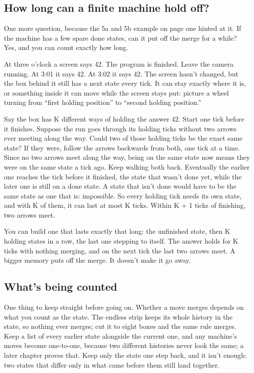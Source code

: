 \documentclass[11pt,twoside]{article}
\theoremstyle{thielethm}
\theoremstyle{thieledef}
\theoremstyle{thieledef}
\theoremstyle{thieledef}
\theoremstyle{thielethm}
\theoremstyle{thieleobs}
\theoremstyle{thielethm}
\begin{document}
\subsection{How long can a finite machine hold off?}

One more question, because the 5a and 5b example on page one hinted at it. If the machine has a few spare done states, can it put off the merge for a while? Yes, and you can count exactly how long.

At three o'clock a screen says 42. The program is finished. Leave the camera running. At 3:01 it says 42. At 3:02 it says 42. The screen hasn't changed, but the box behind it still has a next state every tick. It can stay exactly where it is, or something inside it can move while the screen stays put: picture a wheel turning from ``first holding position'' to ``second holding position.''

Say the box has K different ways of holding the answer 42. Start one tick before it finishes. Suppose the run goes through its holding ticks without two arrows ever meeting along the way. Could two of those holding ticks be the exact same state? If they were, follow the arrows backwards from both, one tick at a time. Since no two arrows meet along the way, being on the same state now means they were on the same state a tick ago. Keep walking both back. Eventually the earlier one reaches the tick before it finished, the state that wasn't done yet, while the later one is still on a done state. A state that isn't done would have to be the same state as one that is: impossible. So every holding tick needs its own state, and with K of them, it can last at most K ticks. Within K + 1 ticks of finishing, two arrows meet.

You can build one that lasts exactly that long: the unfinished state, then K holding states in a row, the last one stepping to itself. The answer holds for K ticks with nothing merging, and on the next tick the last two arrows meet. A bigger memory puts off the merge. It doesn't make it go away.

\subsection{What's being counted}

One thing to keep straight before going on. Whether a move merges depends on what you count as the state. The endless strip keeps its whole history in the state, so nothing ever merges; cut it to eight boxes and the same rule merges. Keep a list of every earlier state alongside the current one, and any machine's moves become one-to-one, because two different histories never look the same; a later chapter proves that. Keep only the state one step back, and it isn't enough: two states that differ only in what came before them still land together.
\end{document}
